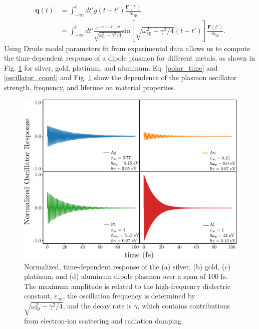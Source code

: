 \documentclass [11pt, proquest] {uwthesis}[2016/11/22]
\begin{document}
\begin{equation}
\begin{aligned}
\textbf{q}(t) & = \int_{-\infty}^{t}dt' g(t-t')\frac{\textbf{F}(t')}{m_{\textrm{sp}}}\\
&= \int_{-\infty}^{t}dt' \frac{e^{-\gamma(t-t')/2}}{\sqrt{\omega_{\textrm{sp}}^2-\gamma^2/4}}\textrm{sin}\left[\sqrt{\omega_{\textrm{sp}}^2-\gamma^2/4}(t-t')\right]\frac{\textbf{F}(t')}{m_{\textrm{sp}}}.
\label{oscillator_coord}
\end{aligned}
\end{equation}
Using Drude model parameters fit from experimental data \cite{JC,Rakic,Weaver,Segall} allows us to compute the time-dependent response of a dipole plasmon for different metals, as shown in Fig. \ref{alpha_metals} for silver, gold, platinum, and aluminum. Eq. \ref{polar_time} and \ref{oscillator_coord} and Fig. \ref{alpha_metals} show the dependence of the plasmon oscillator strength, frequency, and lifetime on material properties.

\begin{figure}
\begin{centering}
\includegraphics{all_alpha.pdf}
\caption{Normalized, time-dependent response of the (a) silver, (b) gold, (c) platinum, and (d) aluminum dipole plasmon over a span of 100 fs. The maximum amplitude is related to the high-frequency dielectric constant, $\varepsilon_{\infty}$, the oscillation frequency is determined by $\sqrt{\omega_{\textrm{sp}}^2 - \gamma^2/4}$, and the decay rate is $\gamma$, which contains contributions from electron-ion scattering and radiation damping.}
\label{alpha_metals}
\end{centering}
\end{figure}
\end{document}
